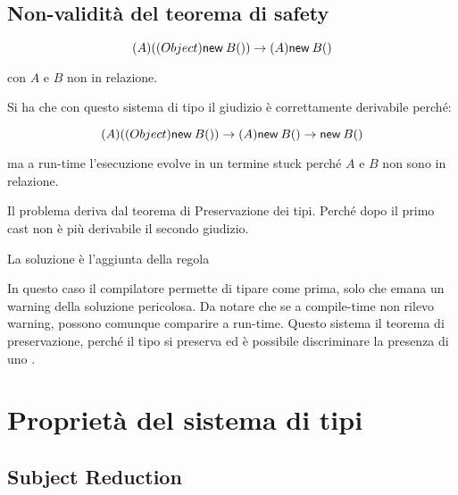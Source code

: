 \begin{prooftree}
	
	
\end{prooftree}

\subsection{Non-validità del teorema di safety}

$$
(A) ((Object)\new{B}{}) \to (A) \new{B}{}
$$

\noindent con $A$ e $B$ non in relazione.

Si ha che con questo sistema di tipo il giudizio è correttamente derivabile perché:

$$
(A) ((Object)\new{B}{}) \to (A) \new{B}{}  \to \new{B}{}
$$

\noindent ma a run-time l'esecuzione evolve in un termine stuck perché $A$ e $B$ non sono in relazione.

Il problema deriva dal teorema di Preservazione dei tipi. Perché dopo il primo cast non è più derivabile il secondo giudizio.

La soluzione è l'aggiunta della regola

\begin{prooftree}
	   
\end{prooftree}

\noindent In questo caso il compilatore permette di tipare come prima, solo che emana un warning della soluzione pericolosa. 
Da notare che se a compile-time non rilevo warning, possono comunque comparire a run-time.
Questo sistema il teorema di preservazione, perché il tipo si preserva ed è possibile discriminare la presenza di uno .


\section{Proprietà del sistema di tipi}

\subsection{Subject Reduction}

